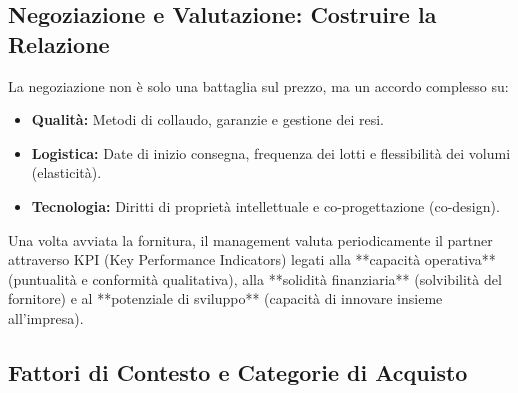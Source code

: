 \documentclass[a4paper,10pt]{article}
\begin{document}
\begin{table}[H]
\setlength{\extrarowheight}{10pt}
\caption{Componenti del Total Cost of Ownership}
\end{table}

\subsection*{Negoziazione e Valutazione: Costruire la Relazione}

La negoziazione non è solo una battaglia sul prezzo, ma un accordo complesso su:
\begin{itemize}
    \item \textbf{Qualità:} Metodi di collaudo, garanzie e gestione dei resi.
    \item \textbf{Logistica:} Date di inizio consegna, frequenza dei lotti e flessibilità dei volumi (elasticità).
    \item \textbf{Tecnologia:} Diritti di proprietà intellettuale e co-progettazione (co-design).
\end{itemize}

Una volta avviata la fornitura, il management valuta periodicamente il partner attraverso KPI (Key Performance Indicators) legati alla **capacità operativa** (puntualità e conformità qualitativa), alla **solidità finanziaria** (solvibilità del fornitore) e al **potenziale di sviluppo** (capacità di innovare insieme all'impresa).

\subsection*{Fattori di Contesto e Categorie di Acquisto}
\end{document}

